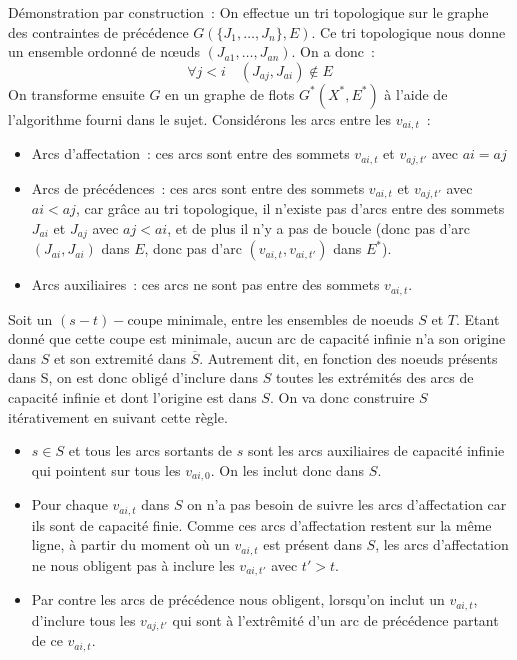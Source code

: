 \documentclass{article}
\begin{document}
Démonstration par construction~: 
On effectue un tri topologique sur le graphe des contraintes de précédence $G(\{J_1, \dots, J_n\}, E)$. Ce tri topologique nous donne un
ensemble ordonné de n\oe uds $(J_{a1}, \dots, J_{an})$. On a donc~:
$$\forall j < i \quad (J_{aj}, J_{ai}) \not\in E$$
On transforme ensuite $G$ en un graphe de flots $G^*(X^*,E^*)$ à l'aide de l'algorithme fourni dans le sujet. 
Considérons les arcs entre les $v_{ai,t}$~: 
\begin{itemize}
	\item Arcs d'affectation~: ces arcs sont entre des sommets $v_{ai,t}$ et $v_{aj,t'}$ avec $ai = aj$
	\item Arcs de précédences~: ces arcs sont entre des sommets $v_{ai,t}$ et $v_{aj,t'}$ avec $ai < aj$, car grâce au tri topologique, il
      n'existe pas d'arcs entre des sommets $J_{ai}$ et $J_{aj}$ avec $aj < ai$, et de plus il n'y a pas de boucle (donc pas d'arc
      $(J_{ai},J_{ai})$ dans $E$, donc pas d'arc $(v_{ai,t}, v_{ai,t'})$ dans $E^*$).
	\item Arcs auxiliaires~: ces arcs ne sont pas entre des sommets $v_{ai,t}$.
\end{itemize}

Soit un $(s-t)-\mathrm{coupe}$ minimale, entre les ensembles de noeuds $S$ et $T$. Etant donné que cette coupe est minimale, aucun arc de
capacité infinie n'a son origine dans $S$ et son extremité dans $\overline{S}$. Autrement dit, en fonction des noeuds présents dans S, on
est donc \og obligé\fg{} d'inclure dans $S$ toutes les extrémités des arcs de capacité infinie et dont l'origine est dans $S$. On va donc
construire $S$ itérativement en suivant cette règle.

\begin{itemize}
\item $s \in S$ et tous les arcs sortants de $s$ sont les arcs auxiliaires de capacité infinie qui pointent sur tous les $v_{ai,0}$. On
  les inclut donc dans $S$.
\item Pour chaque $v_{ai,t}$ dans $S$ on n'a pas besoin de suivre les arcs d'affectation car ils sont de capacité finie. Comme ces arcs
  d'affectation \og restent sur la même ligne\fg, à partir du moment où un $v_{ai,t}$ est présent dans $S$, les arcs d'affectation ne nous
  obligent pas à inclure les $v_{ai,t'}$ avec $t' > t$.
\item Par contre les arcs de précédence nous obligent, lorsqu'on inclut un $v_{ai,t}$, d'inclure tous les $v_{aj,t'}$ qui sont à l'extrêmité
  d'un arc de précédence partant de ce $v_{ai,t}$.
\end{itemize}
\end{document}
